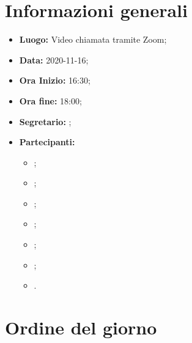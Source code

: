 \documentclass[12pt]{article}
\begin{document}
	
	
	
	
	\newpage
	\tableofcontents
	\newpage
	
	\section{Informazioni generali}
	\begin{itemize}
		\item \textbf{Luogo:} Video chiamata tramite Zoom;
		\item \textbf{Data:} 2020-11-16;
		\item \textbf{Ora Inizio:} 16:30;
		\item \textbf{Ora fine:} 18:00;
		\item \textbf{Segretario:} \MB;
		\item \textbf{Partecipanti:}
		\begin{itemize}
			\item \MB;
			\item \VAS;
			\item \FD;
			\item \NM;
			\item \SB;
			\item \GB;
			\item \MDI.
		\end{itemize}
		
	\end{itemize}
	
	\section{Ordine del giorno}	
		
	
	\newpage
	
	
\end{document}
